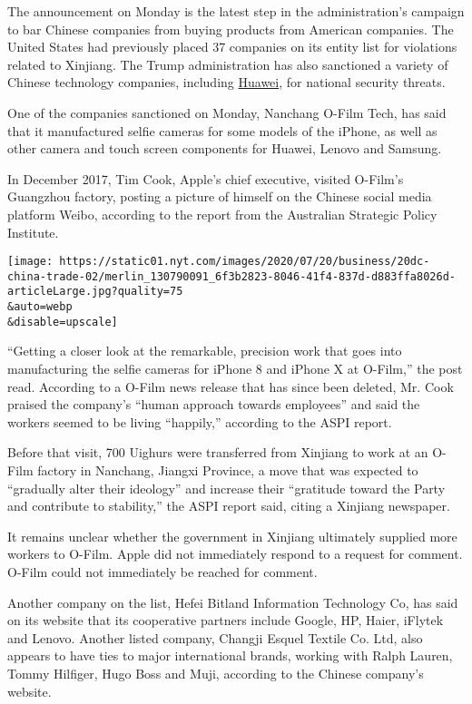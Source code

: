The announcement on Monday is the latest step in the administration's
campaign to bar Chinese companies from buying products from American
companies. The United States had previously placed 37 companies on its
entity list for violations related to Xinjiang. The Trump administration
has also sanctioned a variety of Chinese technology companies, including
\href{https://www.nytimes.com/2020/05/15/business/economy/commerce-department-huawei.html}{Huawei},
for national security threats.

One of the companies sanctioned on Monday, Nanchang O-Film Tech, has
said that it manufactured selfie cameras for some models of the iPhone,
as well as other camera and touch screen components for Huawei, Lenovo
and Samsung.

In December 2017, Tim Cook, Apple's chief executive, visited O-Film's
Guangzhou factory, posting a picture of himself on the Chinese social
media platform Weibo, according to the report from the Australian
Strategic Policy Institute.

\texttt{[image: https://static01.nyt.com/images/2020/07/20/business/20dc-china-trade-02/merlin\_130790091\_6f3b2823-8046-41f4-837d-d883ffa8026d-articleLarge.jpg?quality=75\\\&auto=webp\\\&disable=upscale]}

``Getting a closer look at the remarkable, precision work that goes into
manufacturing the selfie cameras for iPhone 8 and iPhone X at O-Film,''
the post read. According to a O-Film news release that has since been
deleted, Mr. Cook praised the company's ``human approach towards
employees'' and said the workers seemed to be living ``happily,''
according to the ASPI report.

Before that visit, 700 Uighurs were transferred from Xinjiang to work at
an O-Film factory in Nanchang, Jiangxi Province, a move that was
expected to ``gradually alter their ideology'' and increase their
``gratitude toward the Party and contribute to stability,'' the ASPI
report said, citing a Xinjiang newspaper.

It remains unclear whether the government in Xinjiang ultimately
supplied more workers to O-Film. Apple did not immediately respond to a
request for comment. O-Film could not immediately be reached for
comment.

Another company on the list, Hefei Bitland Information Technology Co,
has said on its website that its cooperative partners include Google,
HP, Haier, iFlytek and Lenovo. Another listed company, Changji Esquel
Textile Co. Ltd, also appears to have ties to major international
brands, working with Ralph Lauren, Tommy Hilfiger, Hugo Boss and Muji,
according to the Chinese company's website.

